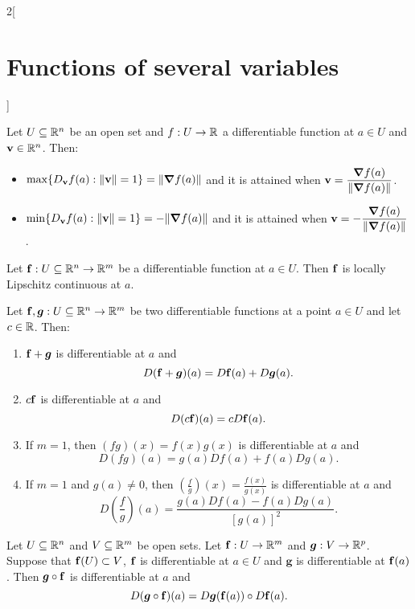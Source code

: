 \documentclass[../../../main.tex]{subfiles}
\begin{document}
\begin{multicols}{2}[\section{Functions of several variables}]
\begin{prop}
    \end{prop}
    \begin{prop}
        Let $U\subseteq\mathbb{R}^n$ be an open set and $f:U\rightarrow\mathbb{R} $ a differentiable function at $a\in U$ and $\textbf{v}\in\mathbb{R}^n$. Then:
        \begin{itemize}
            \item $\displaystyle\max\{D_\textbf{v}f(a):\|\textbf{v}\|=1\}=\|\grad f(a)\|$ and it is attained when $\displaystyle \textbf{v}=\frac{\grad f(a)}{\|\grad f(a)\|}$.
            \item $\displaystyle\min\{D_\textbf{v}f(a):\|\textbf{v}\|=1\}=-\|\grad f(a)\|$ and it is attained when $\displaystyle \textbf{v}=-\frac{\grad f(a)}{\|\grad f(a)\|}$.
        \end{itemize}
    \end{prop}
    \begin{theorem}
        Let $\vb{f}:U\subseteq\mathbb{R}^n\rightarrow\mathbb{R}^m$ be a differentiable function at $a\in U$. Then $\vb{f}$ is locally Lipschitz continuous at $a$.
    \end{theorem}
    \begin{theorem}
        Let $\vb{f},\boldsymbol{g}:U\subseteq\mathbb{R}^n\to\mathbb{R}^m$ be two differentiable functions at a point $a\in U$ and let $c\in\mathbb{R} $. Then:
        \begin{enumerate}
            \item $\vb{f}+\boldsymbol{g}$ is differentiable at $a$ and $$D(\vb{f}+\boldsymbol{g})(a)=D\vb{f}(a)+D\boldsymbol{g}(a).$$
            \item $c\vb{f}$ is differentiable at $a$ and
                  $$D(c\vb{f})(a)=cD\vb{f}(a).$$
            \item If $m=1$, then $(fg)(x)=f(x)g(x)$ is differentiable at $a$ and $$D(fg)(a)=g(a)Df(a)+f(a)Dg(a).$$
            \item If $m=1$ and $g(a)\ne0$, then $\displaystyle\left(\frac{f}{g}\right)(x)=\frac{f(x)}{g(x)}$ is differentiable at $a$ and $$D\left(\frac{f}{g}\right)(a)=\frac{g(a)Df(a)-f(a)Dg(a)}{[g(a)]^2}.$$
        \end{enumerate}
    \end{theorem}
    \begin{theorem}
        Let $U\subseteq\mathbb{R}^n$ and $V\subseteq\mathbb{R}^m$ be open sets. Let $\vb{f}:U\rightarrow\mathbb{R}^m$ and $\boldsymbol{g}:V\rightarrow\mathbb{R}^p$. Suppose that $\vb{f}(U)\subset V$, $\vb{f}$ is differentiable at $a\in U$ and $\boldsymbol{g}$ is differentiable at $\vb{f}(a)$. Then $\boldsymbol{g}\circ \vb{f}$ is differentiable at $a$ and $$D(\boldsymbol{g}\circ \vb{f})(a)=D\boldsymbol{g}(\vb{f}(a))\circ D\vb{f}(a).$$

\end{theorem}
\end{multicols}
\end{document}
